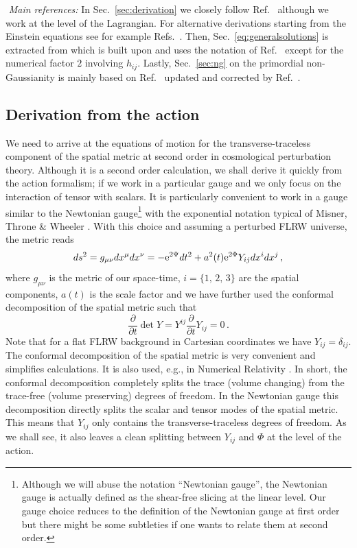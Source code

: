 \documentclass[a4paper,11pt]{article}
\numberwithin{equation}{section}
\begin{document}
\noindent\faBook\,\,\textit{Main references:} In Sec.~\ref{sec:derivation} we closely follow Ref.~\cite{Domenech:2017ems} although we work at the level of the Lagrangian. For alternative derivations starting from the Einstein equations see for example Refs.~\cite{Matarrese:1992rp,Ananda:2006af,Baumann:2007zm}. Then, Sec.~\ref{eq:generalsolutions} is extracted from \cite{Domenech:2019quo} which is built upon and uses the notation of Ref.~\cite{Kohri:2018awv} except for the numerical factor ${2}$ involving $h_{ij}$. Lastly, Sec.~\ref{sec:ng} on the primordial non-Gaussianity is mainly based on Ref.~\cite{Atal:2021jyo} updated and corrected by Ref.~\cite{Adshead:2021hnm}.

\subsection{Derivation from the action \label{sec:derivation}}
We need to arrive at the equations of motion for the transverse-traceless component of the spatial metric at second order in cosmological perturbation theory. Although it is a second order calculation, we shall derive it quickly from the action formalism; if we work in a particular gauge and we only focus on the interaction of tensor with scalars. It is particularly convenient to work in a gauge similar to the Newtonian gauge\footnote{Although we will abuse the notation ``Newtonian gauge'', the Newtonian gauge is actually defined as the shear-free slicing at the linear level. Our gauge choice reduces to the definition of the Newtonian gauge at first order but there might be some subtleties if one wants to relate them at second order.} with the exponential notation typical of Misner, Throne \& Wheeler \cite{Misner:1974qy}. With this choice and assuming a perturbed FLRW universe, the metric reads
\begin{equation}\label{eq:confdecom}
   ds^2=g_{\mu\nu}dx^\mu dx^\nu
   =-{\rm e}^{2\Psi}dt^2+a^2(t){\rm e}^{2\Phi}Y_{ij}dx^idx^j\,,
\end{equation}
where $g_{\mu\nu}$ is the metric of our space-time, $i=\{1,\,2,\,3\}$ are the spatial components, $a(t)$ is the scale factor and we have further used the conformal decomposition of the spatial metric such that
\begin{equation}\label{eq:derdet}
   \frac{\partial}{\partial t}\det Y = Y^{ij}\frac{\partial}{\partial t}Y_{ij}=0\,.
\end{equation}
Note that for a flat FLRW background in Cartesian coordinates we have $Y_{ij}=\delta_{ij}$.
The conformal decomposition of the spatial metric is very convenient and simplifies calculations. It is also used, e.g., in Numerical Relativity \cite{Gourgoulhon:2007ue}. In short, the conformal decomposition completely splits the trace (volume changing) from the trace-free (volume preserving) degrees of freedom. In the Newtonian gauge this decomposition directly splits the scalar and tensor modes of the spatial metric. This means that $Y_{ij}$ only contains the transverse-traceless degrees of freedom. As we shall see, it also leaves a clean splitting between $Y_{ij}$ and $\Phi$ at the level of the action.
   
\end{document}
